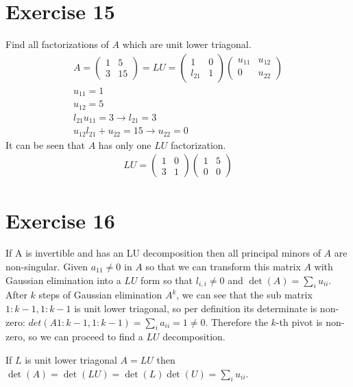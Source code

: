 \section{Exercise 15}
Find all factorizations of $A$ which are unit lower triagonal.
\begin{gather*}
A = \left( \begin{array}{cc}
1 & 5 \\
3 & 15 
\end{array}
\right)
= LU =
\left( \begin{array}{cc}
1 & 0 \\
l_{21} & 1 
\end{array} \right)
\left( \begin{array}{cc}
u_{11} & u_{12} \\
0 & u_{22} 
\end{array} \right)
\\
u_{11} = 1 \\
u_{12} = 5 \\
l_{21} u_{11} = 3 \rightarrow l_{21} = 3 \\
u_{12} l_{21} + u_{22} = 15 \rightarrow u_{22} = 0
\end{gather*}
It can be seen that $A$ has only one $LU$ factorization.
\begin{gather*}
LU =
\left( \begin{array}{cc}
1 & 0 \\
3 & 1 
\end{array} \right)
\left( \begin{array}{cc}
1 & 5 \\
0 & 0 
\end{array} \right)
\end{gather*}
\section{Exercise 16}
If A is invertible and has an LU decomposition then all principal minors of $A$ are non-singular.
Given $a_{11} \neq 0$ in $A$ so that we can transform this matrix $A$ with Gaussian elimination into a $LU$ form so that $l_{i,i} \neq 0$ and $\det(A) = \sum\limits_i u_{ii}$.
After $k$ steps of Gaussian elimination $A^k$, we can see that the sub matrix $1:k-1,1:k-1$ is unit lower triagonal, so per definition its determinate is non-zero: $det(A{1:k-1,1:k-1}) = \sum\limits_i a_{ii} = 1 \neq 0 $. Therefore the $k$-th pivot is non-zero, so we can proceed to find a $LU$ decomposition.

If $L$ is unit lower triagonal $A = LU$ then $\det(A) = \det(LU) = \det(L) \det(U) = \sum\limits_i u_{ii}$.

